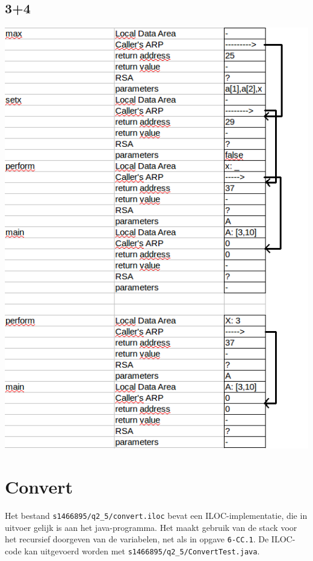 \documentclass[10pt,a4paper,titlepage]{report}
\begin{document}
\section{3+4}
\includegraphics[width=\textwidth]{q2_4/3+4.png}

\chapter{Convert}
Het bestand \verb|s1466895/q2_5/convert.iloc| bevat een ILOC-implementatie, die in uitvoer gelijk is aan het java-programma. Het maakt gebruik van de stack voor het recursief doorgeven van de variabelen, net als in opgave \verb|6-CC.1|. De ILOC-code kan uitgevoerd worden met \verb|s1466895/q2_5/ConvertTest.java|.
\end{document}
